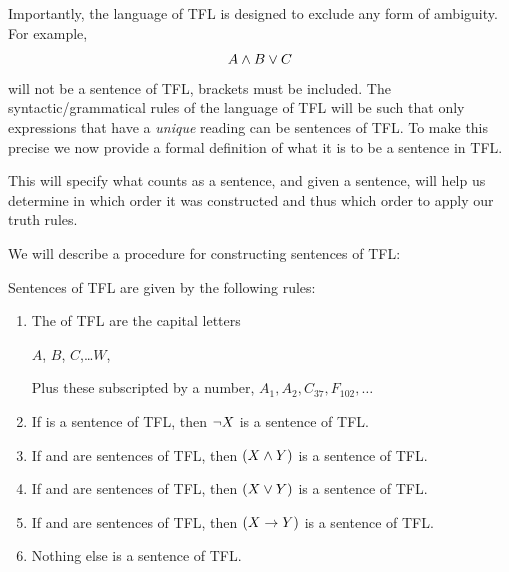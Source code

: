 Importantly, the language of TFL is designed to exclude any form of ambiguity. For example, $$A\mathbin{\wedge} B\vee C$$ will not be a sentence of TFL, brackets must be included. The syntactic/grammatical rules of the language of TFL will be such that only expressions that have a \emph{unique} reading can be sentences of TFL. To make this precise we now provide a formal definition of what it is to be a sentence in TFL.

This will specify what counts as a sentence, and given a sentence, will help us determine in which order it was constructed and thus which order to apply our truth rules. 

We will describe a procedure for constructing sentences of TFL:

\begin{definition}\label{def:TFLsentences}
	
	
	
	
 Sentences of TFL are given by the following rules:
	\begin{enumerate}
		\item The  of TFL are the capital letters
			\begin{center}
					$A$, $B$, $C$,\ldots $W$,
			\end{center}
			Plus these subscripted by a number, $A_{1}, A_2, C_{37}, F_{102},\ldots$
		\item If \metaX is a sentence of TFL, then $\neg X$ is a sentence of TFL.
		\item If \metaX and \metaY are sentences of TFL, then $(X\mathbin{\wedge}Y)$ is a sentence of TFL.
		\item If \metaX and \metaY are sentences of TFL, then $(X\vee Y)$ is a sentence of TFL.
		\item If \metaX and \metaY are sentences of TFL, then $(X\rightarrow Y)$ is a sentence of TFL.
		\item 	Nothing else is a sentence of TFL.
	\end{enumerate}
	
\end{definition}


